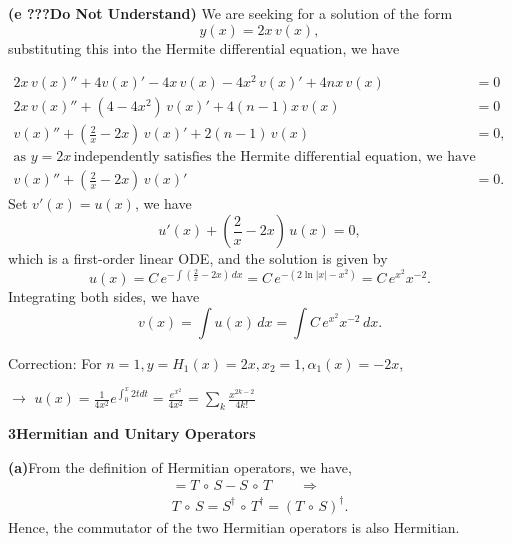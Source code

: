 \documentclass[12pt]{article}
\newcommand{\problem}[2]{%
    \par\vspace{1em}
    \noindent\textbf{#1\quad #2}
    \par\smallskip
}
\begin{document}
\pagebreak

\noindent\textbf{(e ???Do Not Understand)}\quad 
We are seeking for a solution of the form
\begin{equation}
    y(x) = 2x\,v(x),
\end{equation}
substituting this into the Hermite differential equation, we have

\begin{equation}
\begin{split}
    2x\,v(x)'' + 4v(x)' - 4x\,v(x) -4x^2\,v(x)' + 4nx\,v(x)
 &= 0\\
    2x\,v(x)'' + (4-4x^2)\,v(x)' + 4(n-1)x\,v(x) &= 0\\
    v(x)'' + \left(\frac{2}{x}-2x\right)\,v(x)' + 2(n-1)\,v(x) &= 0,\\
  \text{as }y=2x \,\text{independently satisfies the Hermite differential equation, we have } \\
  v(x)'' + \left(\frac{2}{x}-2x\right)\,v(x)' &= 0.
\end{split} 
\end{equation}
Set $v'(x) = u(x)$, we have
\begin{equation}
    u'(x) + \left(\frac{2}{x}-2x\right)\,u(x) = 0,
\end{equation}
which is a first-order linear ODE, and the solution is given by
\begin{equation}
    u(x) = C \, e^{-\int \left(\frac{2}{x}-2x\right)\,dx} = C \, e^{-\left(2\ln|x| - x^2\right)} = C \, e^{x^2} x^{-2}.
\end{equation}
Integrating both sides, we have
\begin{equation}
    v(x) = \int u(x)\,dx = \int C \, e^{x^2} x^{-2}\,dx.
\end{equation}

\smallbreak
\smallbreak
Correction: For $n=1, y=H_1(x)=2x, x_2=1, \alpha_1(x) = -2x$,

$\longrightarrow$ $u(x) = \frac{1}{4x^2}e^{\int_0^x 2t dt} = \frac{e^{x^2}}{4x^2} = \sum_k\frac{x^{2k-2}}{4k!}$


\pagebreak
\problem{3}{Hermitian and Unitary Operators}
\noindent\textbf{(a)}\quad From the definition of Hermitian operators, we have,
\begin{align}
    [T,S] = T \, \circ \, S - S\, \circ \, T \qquad \Longrightarrow \\
    T \, \circ \, S = S^{\dagger} \, \circ \, T^{\dagger} = (T \, \circ \, S)^{\dagger}. 
\end{align}
Hence, the commutator of the two Hermitian operators is also Hermitian.
\end{document}
